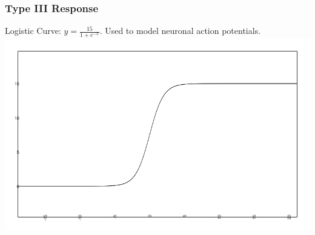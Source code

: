 \begin{frame}
  \frametitle{Type III Response}
    Logistic Curve: $y=\frac{15}{1+e^{-x}}$. Used to model neuronal action potentials.
    \includegraphics[scale=.4]{typeIII.jpg}
\end{frame}

